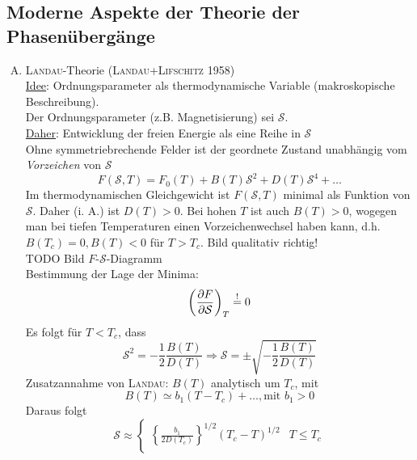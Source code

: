 \subsection{Moderne Aspekte der Theorie der Phasenübergänge}
\begin{enumerate}[A)]
    \item \textsc{Landau}-Theorie (\textsc{Landau+Lifschitz} 1958) \\
    \underline{Idee}: Ordnungsparameter als thermodynamische Variable (makroskopische Beschreibung). \\
    Der Ordnungsparameter (z.B. Magnetisierung) sei $\mathcal{S}$. \\
    \underline{Daher}: Entwicklung der freien Energie als eine Reihe in $\mathcal{S}$ \\
    Ohne symmetriebrechende Felder ist der geordnete Zustand unabhängig vom \emph{Vorzeichen} von $\mathcal{S}$
    \begin{equation}
        F(\mathcal{S}, T) = F_0 (T) + B(T) \mathcal{S}^2 + D(T) \mathcal{S}^4 + \ldots
    \end{equation}
    Im thermodynamischen Gleichgewicht ist $F(\mathcal{S}, T)$ minimal als Funktion von $\mathcal{S}$. Daher (i. A.) ist $D(T)>0$.
    Bei hohen $T$ ist auch $B(T)>0$, wogegen man bei tiefen Temperaturen einen Vorzeichenwechsel haben kann,
    d.h. $B(T_c) = 0, B(T)<0$ für $T>T_c$. Bild qualitativ richtig!\\
    TODO Bild $F$-$\mathcal{S}$-Diagramm \\ %
    Bestimmung der Lage der Minima:
    \begin{equation}
        \left( \frac{\partial F}{\partial \mathcal{S}} \right)_{T} \overset{!}{=} 0
    \end{equation}
    Es folgt für $T < T_c$, dass
    \begin{equation}
        \mathcal{S}^2 = - \frac{1}{2} \frac{B(T)}{D(T)} \Rightarrow \mathcal{S} = \pm \sqrt{- \frac{1}{2} \frac{B(T)}{D(T)}}
    \end{equation}
    Zusatzannahme von \textsc{Landau}: $B(T)$ analytisch um $T_c$, mit
    \begin{equation}
        B(T) \simeq b_1 (T - T_c) + \ldots, \text{mit } b_1 > 0
    \end{equation}
    Daraus folgt
    \begin{equation}
        \mathcal{S} \approx
        \begin{cases}
            \left\{ \frac{b_1}{2 D(T_c)} \right\}^{1/2} (T_c - T)^{1/2} & T \leq T_c \\

\end{cases}
\end{equation}
\end{enumerate}
